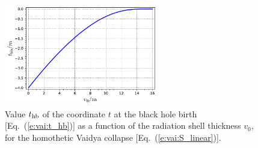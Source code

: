 \begin{figure}
\centerline{\includegraphics[width=0.6\textwidth]{vai_thb_v0.pdf}}
\caption[]{\label{f:vai:thb_v0} \footnotesize
Value $t_{\rm hb}$ of the coordinate $t$ at the black hole birth [Eq.~(\ref{e:vai:t_hb})]
as a function of the radiation shell thickness $v_0$, for
the homothetic Vaidya collapse [Eq.~(\ref{e:vai:S_linear})].
}
\end{figure}


